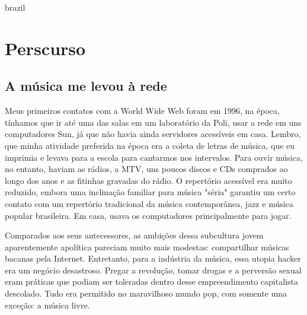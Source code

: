 %


\begin{otherlanguage*}{brazil}

    \chapter
    [Percurso]
    {Perscurso}


    \begin{flushright}
     
    \end{flushright}



\linespread{1.5}

    \section{A música me levou à rede}
    
    Meus primeiros contatos com a World Wide Web foram em 1996, na época, tínhamos que ir até uma das salas em um laboratório da Poli, usar a rede em uns computadores Sun, já que não havia ainda servidores acessíveis em casa. Lembro, que minha atividade preferida na época era a coleta de letras de música, que eu imprimia e levava para a escola para cantarmos nos intervalos. Para ouvir música, no entanto, haviam as rádios, a MTV, uns poucos discos e CDs comprados ao longo dos anos e as fitinhas gravadas do rádio. O repertório acessível era muito reduzido, embora uma inclinação familiar para música "séria" garantiu um certo contato com um repertório tradicional da música contemporânea, jazz e música popular brasileira. Em casa, usava os computadores principalmente para jogar.


    \begin{citacao}
Comparados aos seus antecessores, as ambições dessa subcultura jovem aparentemente apolítica pareciam muito mais modestas: compartilhar músicas bacanas pela Internet. Entretanto, para a indústria da música, essa utopia hacker era um negócio desastroso. Pregar a revolução, tomar drogas e a perversão sexual eram práticas que podiam ser toleradas dentro desse empreendimento capitalista descolado. Tudo era permitido no maravilhoso mundo pop, com somente uma exceção: a música livre.\cite[370]{Barbrook2009}
\end{citacao}


\end{otherlanguage*}
